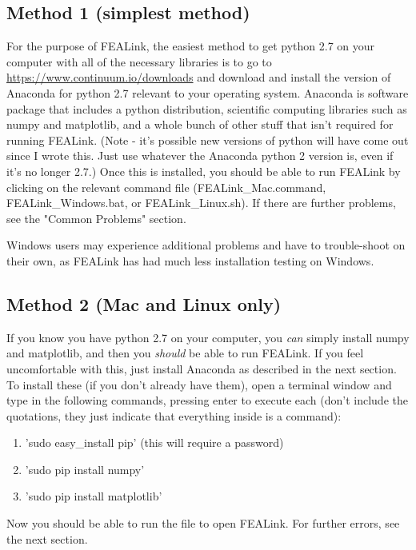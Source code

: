\documentclass[11pt, oneside]{article}   	%
\begin{document}
\subsection{Method 1 (simplest method)}
For the purpose of FEALink, the easiest method to get python 2.7 on your computer with all of the necessary libraries is to go to \url{https://www.continuum.io/downloads} and download and install the version of Anaconda for python 2.7 relevant to your operating system.  Anaconda is software package that includes a python distribution, scientific computing libraries such as numpy and matplotlib, and a whole bunch of other stuff that isn't required for running FEALink.  (Note - it's possible new versions of python will have come out since I wrote this.  Just use whatever the Anaconda python 2 version is, even if it's no longer 2.7.)  Once this is installed, you should be able to run FEALink by clicking on the relevant command file (FEALink\_Mac.command, FEALink\_Windows.bat, or FEALink\_Linux.sh).  If there are further problems, see the "Common Problems" section.

Windows users may experience additional problems and have to trouble-shoot on their own, as FEALink has had much less installation testing on Windows.

\subsection{Method 2 (Mac and Linux only)}
If you know you have python 2.7 on your computer, you \textit{can} simply install numpy and matplotlib, and then you \textit{should} be able to run FEALink.  If you feel uncomfortable with this, just install Anaconda as described in the next section.  To install these (if you don't already have them), open a terminal window and type in the following commands, pressing enter to execute each (don't include the quotations, they just indicate that everything inside is a command): 
\begin{enumerate}
	\item 'sudo easy\_install pip' (this will require a password) 
	\item 'sudo pip install numpy'
	\item 'sudo pip install matplotlib'
\end{enumerate} 

Now you should be able to run the file to open FEALink.  For further errors, see the next section.
\end{document}
